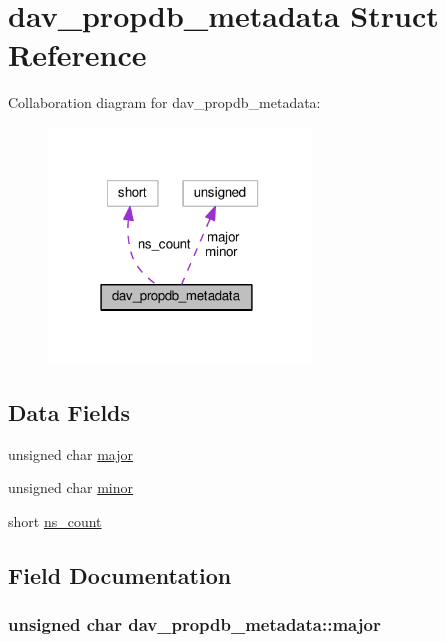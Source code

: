 \hypertarget{structdav__propdb__metadata}{}\section{dav\+\_\+propdb\+\_\+metadata Struct Reference}
\label{structdav__propdb__metadata}


Collaboration diagram for dav\+\_\+propdb\+\_\+metadata\+:
\nopagebreak
\begin{figure}[H]
\begin{center}
\leavevmode
\includegraphics[width=198pt]{structdav__propdb__metadata__coll__graph}
\end{center}
\end{figure}
\subsection*{Data Fields}
\begin{DoxyCompactItemize}
\item 
unsigned char \hyperlink{structdav__propdb__metadata_a9a9a63c835105f35d8ad481c7a19b757}{major}
\item 
unsigned char \hyperlink{structdav__propdb__metadata_a5a91e65bc6cbc26135eb36362f5eed48}{minor}
\item 
short \hyperlink{structdav__propdb__metadata_a5c548115d5a2f4212ae9890026053b34}{ns\+\_\+count}
\end{DoxyCompactItemize}


\subsection{Field Documentation}
\subsubsection[{\texorpdfstring{major}{major}}]{\setlength{\rightskip}{0pt plus 5cm}unsigned char dav\+\_\+propdb\+\_\+metadata\+::major}\hypertarget{structdav__propdb__metadata_a9a9a63c835105f35d8ad481c7a19b757}{}\label{structdav__propdb__metadata_a9a9a63c835105f35d8ad481c7a19b757}
